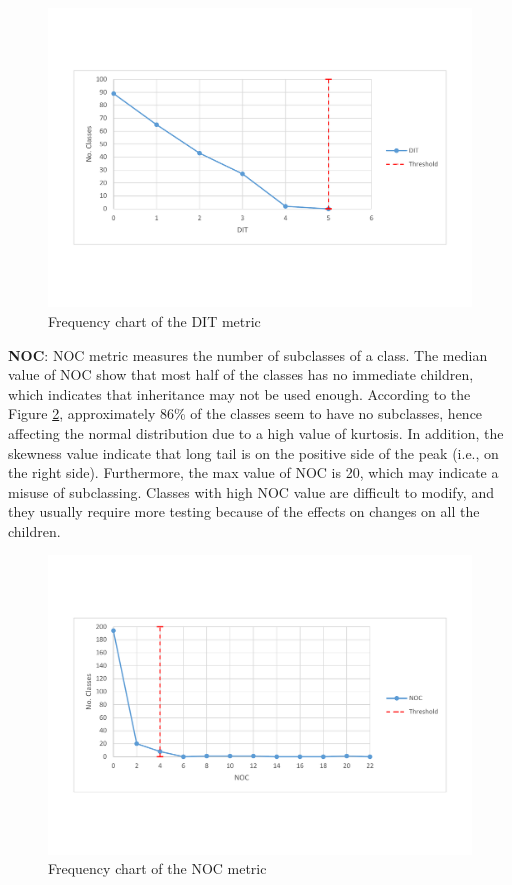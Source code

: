 \begin{figure}
	\centering
	\includegraphics[width=\textwidth]{images/threshold/dit.pdf}
	\caption{Frequency chart of the DIT metric}
	\label{fig:ditdistribution}
\end{figure}


\textbf{NOC}: NOC metric measures the number of subclasses of a class. The median value of NOC show that most half of the classes has no immediate children, which indicates that inheritance may not be used enough. According to the Figure \ref{fig:nocdistribution}, approximately 86\% of the classes seem to have no subclasses, hence affecting the normal distribution due to a high value of kurtosis. In addition, the skewness value indicate that long tail is on the positive side of the peak (i.e., on the right side). Furthermore, the max value of NOC is 20, which may indicate a misuse of subclassing. Classes with high NOC value are difficult to modify, and they usually require more testing because of the effects on changes on all the children. 

\begin{figure}
	\centering
	\includegraphics[width=\textwidth]{images/threshold/noc.pdf}
	\caption{Frequency chart of the NOC metric}
	\label{fig:nocdistribution}
\end{figure}


